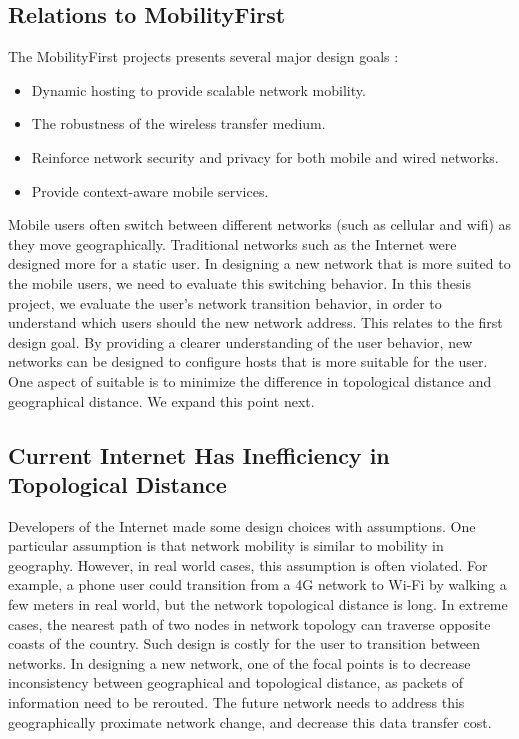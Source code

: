 \documentclass[]{article}
\begin{document}
\subsection{Relations to MobilityFirst}
The MobilityFirst projects presents several major design goals \cite{mobilityfirst}:

\begin{itemize}
\item
Dynamic hosting to provide scalable network mobility.
\item
The robustness of the wireless transfer medium.
\item
Reinforce network security and privacy for both mobile and wired networks.
\item
Provide context-aware mobile services.
\end{itemize}

Mobile users often switch between different networks (such as cellular and wifi) as they move geographically. Traditional networks such as the Internet were designed more for a static user. In designing a new network that is more suited to the mobile users, we need to evaluate this switching behavior. In this thesis project, we evaluate the user's network transition behavior, in order to understand which users should the new network address. This relates to the first design goal. By providing a clearer understanding of the user behavior, new networks can be designed to configure hosts that is more suitable for the user. One aspect of suitable is to minimize the difference in topological distance and geographical distance. We expand this point next.

\subsection{Current Internet Has Inefficiency in Topological Distance}
Developers of the Internet made some design choices with assumptions. One particular assumption is that network mobility is similar to mobility in geography\cite{jacobson}. However, in real world cases, this assumption is often violated. For example, a phone user could transition from a 4G network to Wi-Fi by walking a few meters in real world, but the network topological distance is long. In extreme cases, the nearest path of two nodes in network topology can traverse opposite coasts of the country. Such design is costly for the user to transition between networks. In designing a new network, one of the focal points is to decrease inconsistency between geographical and topological distance, as packets of information need to be rerouted. The future network needs to address this geographically proximate network change, and decrease this data transfer cost.
\end{document}
